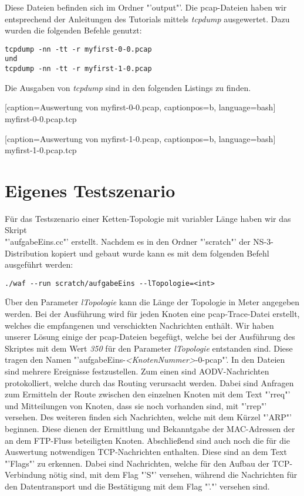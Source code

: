 \documentclass[12pt,a4paper,titlepage]{article}
\begin{document}
Diese Dateien befinden sich im Ordner "'output"'. Die pcap-Dateien haben wir entsprechend der Anleitungen des Tutorials mittels \textit{tcpdump} ausgewertet. Dazu wurden die folgenden Befehle genutzt:

\begin{lstlisting}
tcpdump -nn -tt -r myfirst-0-0.pcap
und
tcpdump -nn -tt -r myfirst-1-0.pcap
\end{lstlisting}

Die Ausgaben von \textit{tcpdump} sind in den folgenden Listings zu finden.


	[caption={Auswertung von myfirst-0-0.pcap}\label{lst:myfirst_1_pcap},
		captionpos=b,
		language=bash] %
	{myfirst-0-0.pcap.tcp}


	[caption={Auswertung von myfirst-1-0.pcap}\label{lst:myfirst_2_pcap},
		captionpos=b,
		language=bash] %
	{myfirst-1-0.pcap.tcp}

\section{Eigenes Testszenario}

Für das Testszenario einer Ketten-Topologie mit variabler Länge haben wir das Skript\\ "'aufgabeEins.cc"' erstellt. Nachdem es in den Ordner "'scratch"' der NS-3-Distribution kopiert und gebaut wurde kann es mit dem folgenden Befehl ausgeführt werden:

\begin{lstlisting}
./waf --run scratch/aufgabeEins --lTopologie=<int>
\end{lstlisting}

Über den Parameter \textit{lTopologie} kann die Länge der Topologie in Meter angegeben werden.
Bei der Ausführung wird für jeden Knoten eine pcap-Trace-Datei erstellt, welches die empfangenen und verschickten Nachrichten enthält. Wir haben unserer Lösung einige der pcap-Dateien begefügt, welche bei der Ausführung des Skriptes mit dem Wert \textit{350} für den Parameter \textit{lTopologie} entstanden sind. Diese tragen den Namen "'aufgabeEins-\textit{\textless KnotenNummer\textgreater}-0-pcap"'. 
In den Dateien sind mehrere Ereignisse festzustellen. Zum einen sind AODV-Nachrichten protokolliert, welche durch das Routing verursacht werden. Dabei sind Anfragen zum Ermitteln der Route zwischen den einzelnen Knoten mit dem Text "'rreq"'  und Mitteilungen von Knoten, dass sie noch vorhanden sind, mit "'rrep"' versehen. 
Des weiteren finden sich Nachrichten, welche mit dem Kürzel "'ARP"' beginnen. Diese dienen der Ermittlung und Bekanntgabe der MAC-Adressen der an dem FTP-Fluss beteiligten Knoten. Abschließend sind auch noch die für die Auswertung notwendigen TCP-Nachrichten enthalten. Diese sind an dem Text "'Flags"' zu erkennen. Dabei sind Nachrichten, welche für den Aufbau der TCP-Verbindung nötig sind, mit dem Flag "'S"' versehen, während die Nachrichten für den Datentransport und die Bestätigung mit dem Flag "'."' versehen sind.
\end{document}
